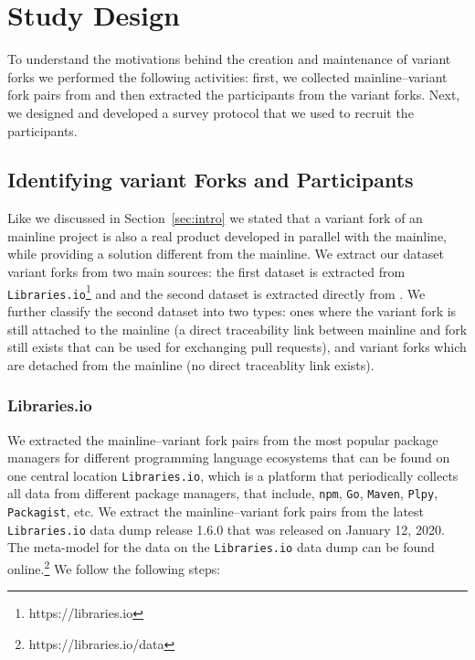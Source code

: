 \section{Study Design}
\label{sec:study_design}
To understand the motivations behind the creation and maintenance of variant forks we performed the following activities: first, we collected mainline--variant fork pairs from \gh and then extracted the participants from the variant forks. Next, we designed and developed a survey protocol that we used to recruit the participants.


\subsection{Identifying variant Forks and Participants}
\label{sec:forks_and_participants}
Like we discussed in Section~\ref{sec:intro} we stated that a variant fork of an mainline project is also a real product developed in parallel with the mainline, while providing a solution different from the mainline.
We extract our dataset variant forks from two main sources: the first dataset is extracted from \texttt{Libraries.io}\footnote{https://libraries.io} and and the second dataset is extracted directly from \gh. We further classify the second dataset into two types: ones where the variant fork is still attached to the mainline (a direct traceability link between mainline and fork still exists that can be used for exchanging pull requests), and variant forks which are detached from the mainline (no direct traceablity link exists).


\subsubsection{Libraries.io}
\label{sec:library.io}
We extracted the mainline--variant fork pairs from the most popular package managers for different programming language ecosystems that can be found on one central location \texttt{Libraries.io}, which is a platform that periodically collects all data from different package managers, that include, \texttt{npm}, \texttt{Go}, \texttt{Maven}, \texttt{Plpy}, \texttt{Packagist}, etc. We extract the mainline--variant fork pairs from the latest \texttt{Libraries.io} data dump release 1.6.0 that was released on January 12, 2020. The meta-model for the data on the \texttt{Libraries.io} data dump can be found online.\footnote{https://libraries.io/data}
We follow the following steps:

